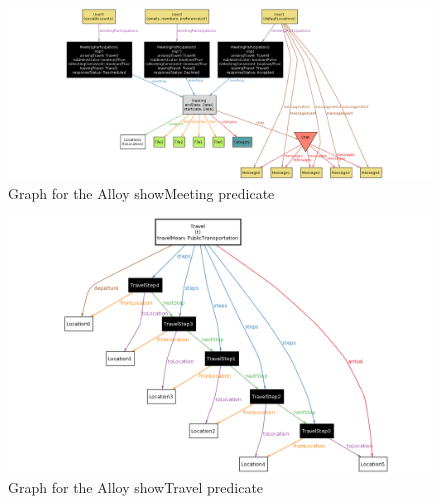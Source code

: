 \begin{figure}
	\hspace*{-5cm}
	\centering\includegraphics[scale=0.48]{Images/AlloyShowMeeting2.png}
	\caption{Graph for the Alloy showMeeting predicate}
\end{figure}

\begin{figure}
	\hspace*{-2cm}
	\centering\includegraphics[scale=0.5]{Images/AlloyShowTravel2.png}
	\caption{Graph for the Alloy showTravel predicate}
\end{figure}